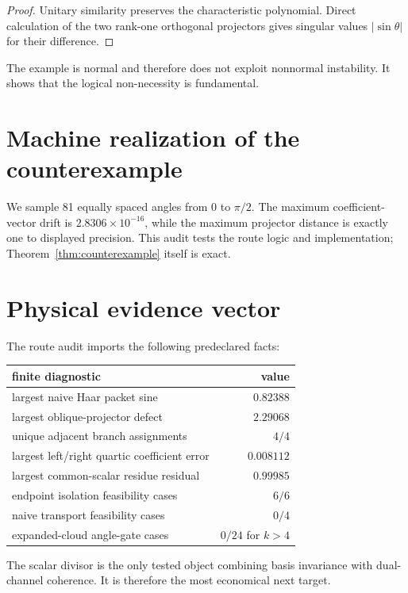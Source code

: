\documentclass[12pt]{article}
\theoremstyle{remark}\newtheorem{remark}[theorem]{Remark}
\begin{document}
\begin{proof}
Unitary similarity preserves the characteristic polynomial.  Direct
calculation of the two rank-one orthogonal projectors gives singular values
$|\sin\theta|$ for their difference.
\end{proof}

The example is normal and therefore does not exploit nonnormal instability.
It shows that the logical non-necessity is fundamental.

\section{Machine realization of the counterexample}

We sample 81 equally spaced angles from $0$ to $\pi/2$.  The maximum
coefficient-vector drift is $2.8306\times10^{-16}$, while the maximum
projector distance is exactly one to displayed precision.  This audit tests
the route logic and implementation; Theorem~\ref{thm:counterexample} itself
is exact.

\section{Physical evidence vector}

The route audit imports the following predeclared facts:
\begin{center}
\small
\begin{tabular}{p{}r}
\toprule
finite diagnostic & value\\
\midrule
largest naive Haar packet sine & $0.82388$\\
largest oblique-projector defect & $2.29068$\\
unique adjacent branch assignments & $4/4$\\
largest left/right quartic coefficient error & $0.008112$\\
largest common-scalar residue residual & $0.99985$\\
endpoint isolation feasibility cases & $6/6$\\
naive transport feasibility cases & $0/4$\\
expanded-cloud angle-gate cases & $0/24$ for $k>4$\\
\bottomrule
\end{tabular}
\end{center}
The scalar divisor is the only tested object combining basis invariance with
dual-channel coherence.  It is therefore the most economical next target.
\end{document}
